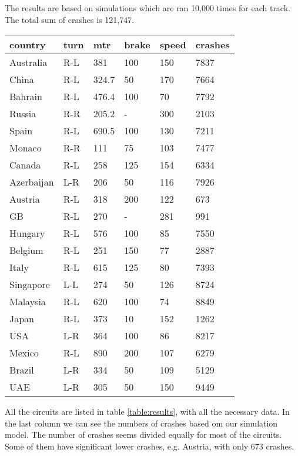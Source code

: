 The results are based on simulations which are ran 10,000 times for each track. The total sum of crashes is 121,747.

\begin{tabularx}{.50\textwidth}{Xlllll}
country    & turn &mtr&brake  &speed &crashes\\
\hline
Australia  & R-L       & 381    &100    &150   &7837\\
China      & R-L       & 324.7  &50     &170   &7664\\
Bahrain    & R-L       & 476.4  &100    &70    &7792\\
Russia     & R-R       & 205.2  &-      &300   &2103\\
Spain      & R-L       & 690.5  &100    &130   &7211\\
Monaco     & R-R       & 111    &75     &103   &7477\\
Canada     & R-L       & 258    &125    &154   &6334\\
Azerbaijan & L-R       & 206    &50     &116   &7926\\
Austria    & R-L       & 318    &200    &122   &673\\
GB         & R-L       & 270    &-      &281   &991\\
Hungary    & R-L       & 576    &100    &85    &7550\\
Belgium    & R-L       & 251    &150    &77    &2887\\
Italy      & R-L       & 615    &125    &80    &7393\\
Singapore  & L-L       & 274    &50     &126   &8724\\
Malaysia   & R-L       & 620    &100    &74    &8849\\
Japan      & R-L       & 373    &10     &152   &1262\\
USA        & L-R       & 364    &100    &86    &8217\\
Mexico     & R-L       & 890    &200    &107   &6279\\
Brazil     & L-R       & 334    &50     &109   &5129\\
UAE        & L-R       & 305    &50     &150   &9449\\
\end{tabularx}
\label{table:results}

All the circuits are listed in table \ref{table:results}, with all the necessary data. In the last column we can see the numbers of crashes based om our simulation model. The number of crashes seems divided equally for most of the circuits. Some of them have significant lower crashes, e.g. Austria, with only 673 crashes.


